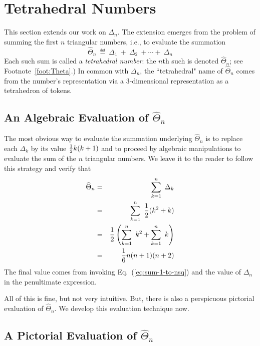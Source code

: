 \section{Tetrahedral Numbers}
\label{sec:tetraedralNumbers}

 

This section extends our work on $\Delta_n$.  The extension emerges from the problem of summing the first $n$ triangular numbers, i.e., to evaluate the summation
\[ \widehat{\Theta}_n \ \eqdef \ \Delta_1 \ + \ \Delta_2 \ + \cdots +\ \Delta_n \]
Each such sum is called a {\it tetrahedral number}: the  $n$th such is denoted $\widehat{\Theta}_n$; see Footnote~\ref{foot:Theta}.)  In common with $\Delta_n$, the ``tetrahedral" name of $\widehat{\Theta}_n$ comes from the number's representation via a 3-dimensional representation as a tetrahedron of tokens. 

\subsection{An Algebraic Evaluation of $\widehat{\Theta}_n$}

The most obvious way to evaluate the summation underlying $\widehat{\Theta}_n$ is to replace each $\Delta_k$ by its value ${1 \over 2}k (k+1)$ and to proceed by algebraic manipulations to evaluate the sum of the $n$ triangular numbers.  We leave it to the reader to follow this strategy and verify that
\begin{eqnarray*}
\widehat{\Theta}_n & = & \sum_{k=1}^{n} \ \Delta_k \\
      & = & \sum_{k=1}^{n} \ \frac{1}{2} (k^2 + k) \\
      & =  & \frac{1}{2} \left( \sum_{k=1}^{n} \ k^2 + \sum_{k=1}^{n}  \ k \right) \\
      & = & {1 \over 6} n (n+1)(n+2)
\end{eqnarray*}
The final value comes from invoking Eq.~(\ref{eq:sum-1-to-nsq}) and the value of $\Delta_n$ in the penultimate expression. 

\smallskip

All of this is fine, but not very intuitive.  But, there is also a perspicuous pictorial evaluation of $\widehat{\Theta}_n$.  We develop this evaluation technique now.

\subsection{A Pictorial Evaluation of $\widehat{\Theta}_n$}

